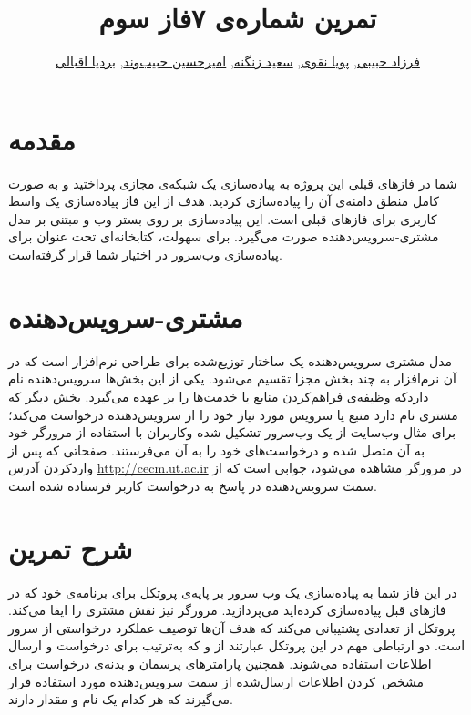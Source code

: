 \documentclass{utap}
\title{تمرین شماره‌ی ۷\normalsize\qquad فاز سوم}
\author{%
		\href{mailto:farzadhabibii98@gmail.com?subject=[AP\%20S98\%20A7]\%20}{فرزاد حبیبی},
		\href{mailto:naghavi.pooya@gmail.com?subject=[AP\%20S98\%20A7]\%20}{پویا نقوی},
	\href{mailto:zangenehsaeed412@gmail.com?subject=[AP\%20S98\%20A7]\%20}{سعید زنگنه},
		\href{mailto:ahhabibvand@gmail.com?subject=[AP\%20S98\%20A7]\%20}{امیرحسین حبیب‌وند},
	\href{mailto:bardia.eghbali@gmail.com?subject=[AP\%20S98\%20A7]\%20}{بردیا اقبالی}%
}
\begin{document}
	\maketitle
	\section*{مقدمه}

		شما در فاز‌های قبلی این پروژه به پیاده‌سازی یک شبکه‌ی مجازی پرداختید و به صورت کامل منطق دامنه‌ی آن را پیاده‌سازی کردید.
		هدف از این فاز پیاده‌سازی یک واسط کاربری برای فاز‌های قبلی است. این پیاده‌سازی بر روی بستر وب و مبتنی بر مدل مشتری-سرویس‌دهنده صورت می‌گیرد.
		برای سهولت، کتابخانه‌ای تحت عنوان \href{https://github.com/UTAP/APHTTP}{} برای پیاده‌سازی وب‌سرور در اختیار شما قرار گرفته‌است.
	
	
	\section*{مشتری-سرویس‌دهنده}
			مدل مشتری‌-‌سرویس‌دهنده یک ساختار توزیع‌شده برای طراحی نرم‌افزار است که در آن نرم‌افزار به چند بخش مجزا تقسیم می‌شود. یکی از این بخش‌ها سرویس‌دهنده نام داردکه وظیفه‌ی فراهم‌کردن منابع یا خدمت‌ها را بر عهده می‌گیرد. بخش دیگر که مشتری نام دارد منبع یا سرویس مورد نیاز خود را از سرویس‌دهنده درخواست می‌کند؛ برای مثال وب‌سایت  از یک وب‌سرور تشکیل شده وکاربران با استفاده از مرورگر خود به آن متصل شده و درخواست‌های خود را به آن می‌فرستند. صفحاتی که پس از واردکردن آدرس
	\url{http://cecm.ut.ac.ir} 
	 در مرورگر مشاهده می‌شود، جوابی است که از سمت سرویس‌دهنده در پاسخ به درخواست کاربر فرستاده شده است.


	\section{شرح تمرین}

		در این فاز شما به پیادەسازی یک وب سرور بر پایه‌ی پروتکل
		برای برنامه‌ی خود که در فازهای قبل پیادەسازی کردەاید می‌پردازید. مرورگر نیز نقش مشتری را ایفا می‌کند. پروتکل  از تعدادی  پشتیبانی می‌کند که هدف آن‌ها توصیف عملکرد درخواستی از سرور است. دو  ارتباطی مهم در این پروتکل عبارتند از  و  که به‌ترتیب برای درخواست و ارسال اطلاعات استفاده می‌شوند. همچنین پارامتر‌های پرسمان و بدنه‌ی درخواست برای مشخص~کردن اطلاعات ارسال‌شده از سمت سرویس‌دهنده مورد استفاده قرار می‌گیرند که هر کدام یک نام و مقدار دارند. 
		
\end{document}
